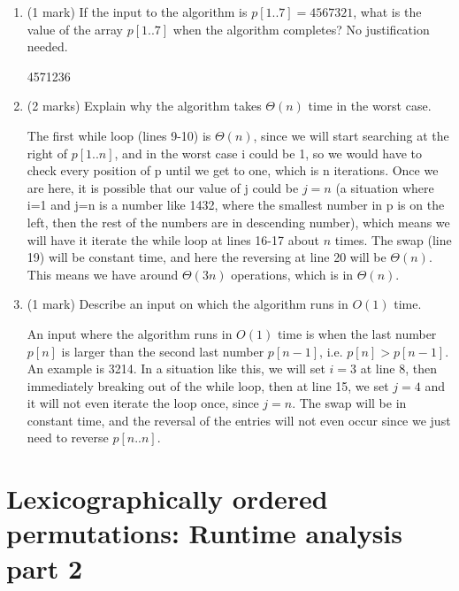 \documentclass[11pt]{article}
\begin{document}
\newpage
\begin{enumerate}
\item (1 mark)
If the input to the algorithm is 
$p[1..7] = 4567321$, 
what is the value of the array $p[1..7]$ when the algorithm completes?
No justification needed.\\
\begin{soln}
4571236
\end{soln}


\item
(2 marks)
Explain why the algorithm takes $\Theta(n)$ time in the worst case.

\begin{soln}
The first while loop (lines 9-10) is $\Theta(n)$, since we will start searching at the right of $p[1..n]$, and in the worst case i could be 1, so we would have to check every position of p until we get to one, which is n iterations. Once we are here, it is possible that our value of j could be $j=n$ (a situation where i=1 and j=n is a number like 1432, where the smallest number in p is on the left, then the rest of the numbers are in descending number), which means we will have it iterate the while loop at lines 16-17 about $n$ times. The swap (line 19) will be constant time, and here the reversing at line 20 will be $\Theta(n)$. This means we have around $\Theta(3n)$ operations, which is in $\Theta(n)$.
\end{soln}

\item (1 mark)
Describe an input on which the algorithm runs in $O(1)$ time.

\begin{soln}
An input where the algorithm runs in $O(1)$ time is when the last number $p[n]$ is larger than the second last number $p[n-1]$, i.e. $p[n] > p[n-1]$. An example is 3214. In a situation like this, we will set $i=3$ at line 8, then immediately breaking out of the while loop, then at line 15, we set $j=4$ and it will not even iterate the loop once, since $j=n$. The swap will be in constant time, and the reversal of the entries will not even occur since we just need to reverse $p[n..n]$.
\end{soln}

\end{enumerate}

\newpage

\section{Lexicographically ordered permutations: Runtime analysis part 2}
\end{document}
